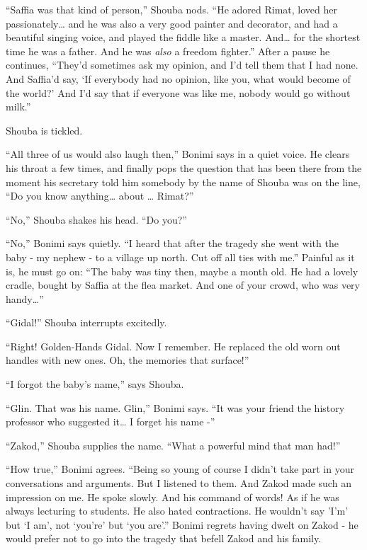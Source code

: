 \documentclass[twoside,11pt]{book}
\begin{document}
``Saffia was that kind of person,'' Shouba nods. ``He adored Rimat, loved her
passionately{\dots} and he was also a very good painter and decorator, and had a beautiful singing voice, and played
the fiddle like a master. And{\dots} for the shortest time he was a father. And he was \textit{also} a freedom
fighter.'' After a pause he continues, ``They'd sometimes ask my opinion, and I'd tell them
that I had none. And Saffia'd say, `If everybody had no opinion, like you, what would become of the world?' And I'd say
that if everyone was like me, nobody would go without milk.''

Shouba is tickled.

``All three of us would also laugh then,'' Bonimi says in a quiet voice. He clears his throat
a few times, and finally pops the question that has been there from the moment his secretary told him somebody by the
name of Shouba was on the line, ``Do you know anything{\dots} about {\dots} Rimat?''

``No,'' Shouba shakes his head. ``Do you?''

``No,'' Bonimi says quietly. ``I heard that after the tragedy she went with the
baby - my nephew - to a village up north. Cut off all ties with me.'' Painful as it is, he must go on: ``The baby was
tiny then, maybe a month old. He had a lovely cradle, bought by Saffia at the flea market. And one of your crowd, who
was very handy{\dots}''

``Gidal!'' Shouba interrupts excitedly.

``Right! Golden-Hands Gidal. Now I remember. He replaced the old worn out handles with new ones. Oh, the
memories that surface!''

``I forgot the baby's name,'' says Shouba.

``Glin. That was his name. Glin,'' Bonimi says. ``It was your friend the history
professor who suggested it{\dots} I forget his name -''

``Zakod,'' Shouba supplies the name. ``What a powerful mind that man
had!''

``How true,'' Bonimi agrees. ``Being so young of course I didn't take part in
your conversations and arguments. But I listened to them. And Zakod made such an impression on me. He spoke slowly. And
his command of words! As if he was always lecturing to students. He also hated contractions. He wouldn't say 'I'm' but
`I am', not `you're' but `you are'.'' Bonimi regrets having dwelt on Zakod - he would prefer not to go
into the tragedy that befell Zakod and his family.
\end{document}
